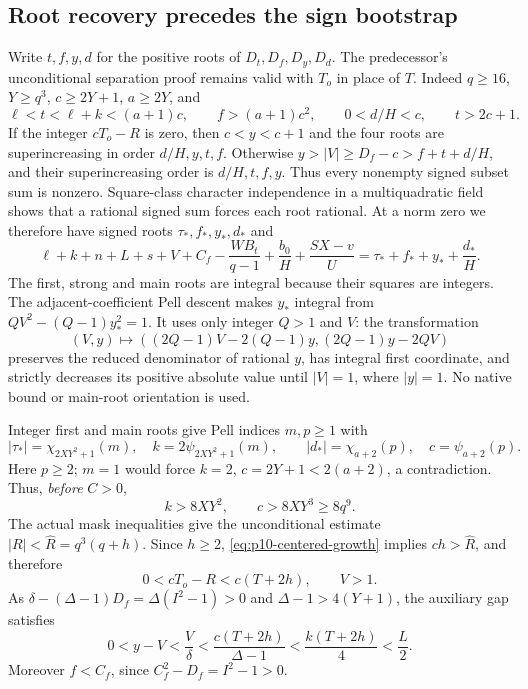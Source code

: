 \subsection{Root recovery precedes the sign bootstrap}

Write $t,f,y,d$ for the positive roots of $D_t,D_f,D_y,D_d$.
The predecessor's unconditional separation proof remains valid with $T_o$
in place of $T$. Indeed $q\ge16$, $Y\ge q^3$, $c\ge2Y+1$, $a\ge2Y$, and
\[
 \ell<t<\ell+k<(a+1)c,\qquad
 f>(a+1)c^2,\qquad 0<d/H<c,\qquad t>2c+1.
\]
If the integer $cT_o-R$ is zero, then $c<y<c+1$ and the four roots are
superincreasing in order $d/H,y,t,f$. Otherwise
$y>|V|\ge D_f-c>f+t+d/H$, and their superincreasing order is $d/H,t,f,y$.
Thus every nonempty signed subset sum is nonzero. Square-class character
independence in a multiquadratic field shows that a rational signed sum
forces each root rational. At a norm zero we therefore have signed roots
$\tau_*,f_*,y_*,d_*$ and
\begin{equation}
 \ell+k+n+L+s+V+C_f-\frac{WB_t}{q-1}
 +\frac{b_0}{H}+\frac{SX-v}{U}
 =\tau_*+f_*+y_*+\frac{d_*}{H}.
 \label{eq:p10-centered-root}
\end{equation}
The first, strong and main roots are integral because their squares are
integers. The adjacent-coefficient Pell descent makes $y_*$ integral from
$QV^2-(Q-1)y_*^2=1$. It uses only integer $Q>1$ and $V$: the transformation
\[
 (V,y)\longmapsto
 ((2Q-1)V-2(Q-1)y,(2Q-1)y-2QV)
\]
preserves the reduced denominator of rational $y$, has integral first
coordinate, and strictly decreases its positive absolute value until
$|V|=1$, where $|y|=1$. No native bound or main-root orientation is used.

Integer first and main roots give Pell indices $m,p\ge1$ with
\[
 |\tau_*|=\chi_{2XY^2+1}(m),\quad k=2\psi_{2XY^2+1}(m),\qquad
 |d_*|=\chi_{a+2}(p),\quad c=\psi_{a+2}(p).
\]
Here $p\ge2$; $m=1$ would force $k=2$, $c=2Y+1<2(a+2)$, a contradiction.
Thus, \emph{before} $C>0$,
\begin{equation}
 k>8XY^2,\qquad c>8XY^3\ge8q^9.
 \label{eq:p10-centered-growth}
\end{equation}
The actual mask inequalities give the unconditional estimate
$|R|<\widehat R=q^3(q+h)$. Since $h\ge2$, \eqref{eq:p10-centered-growth}
implies $ch>\widehat R$, and therefore
\[
 0<cT_o-R<c(T+2h),\qquad V>1.
\]
As $\delta-(\Delta-1)D_f=\Delta(I^2-1)>0$ and
$\Delta-1>4(Y+1)$, the auxiliary gap satisfies
\begin{equation}
 0<y-V<\frac{V}{\delta}
 <\frac{c(T+2h)}{\Delta-1}
 <\frac{k(T+2h)}4<\frac L2.
 \label{eq:p10-centered-ybound}
\end{equation}
Moreover $f<C_f$, since $C_f^2-D_f=I^2-1>0$.

